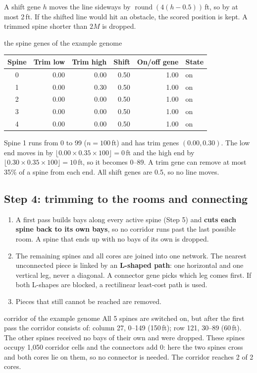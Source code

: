 \documentclass[10pt,a4paper]{article}
\begin{document}
A shift gene $h$ moves the line sideways by $\operatorname{round}(4(h - 0.5))$\,ft, so by at most 2\,ft. If the shifted
line would hit an obstacle, the scored position is kept. A trimmed spine shorter than $2M$ is dropped.

\begin{example}{the spine genes of the example genome}
\begin{center}\centering\small
\begin{tabular}{@{}c r r r r l@{}}
\toprule
\textbf{Spine} & \textbf{Trim low} & \textbf{Trim high} & \textbf{Shift} & \textbf{On/off gene} & \textbf{State} \\ \midrule
0 & 0.00 & 0.00 & 0.50 & 1.00 & on \\
1 & 0.00 & 0.30 & 0.50 & 1.00 & on \\
2 & 0.00 & 0.00 & 0.50 & 1.00 & on \\
3 & 0.00 & 0.00 & 0.50 & 1.00 & on \\
4 & 0.00 & 0.00 & 0.50 & 1.00 & on \\
\bottomrule
\end{tabular}
\end{center}
Spine 1 runs from 0 to 99 ($n = 100$\,ft) and has trim genes
$(0.00, 0.30)$. The low end moves in by $\lfloor 0.00 \times 0.35 \times 100 \rfloor = 0$\,ft and the
high end by $\lfloor 0.30 \times 0.35 \times 100 \rfloor = 10$\,ft, so it becomes 0--89. A trim
gene can remove at most 35\% of a spine from each end. All shift genes are 0.5, so no line moves.
\end{example}

\subsection{Step 4: trimming to the rooms and connecting}
\begin{enumerate}
\item A first pass builds bays along every active spine (Step 5) and \textbf{cuts each spine back to its own bays}, so
no corridor runs past the last possible room. A spine that ends up with no bays of its own is dropped.
\item The remaining spines and all cores are joined into one network. The nearest unconnected piece is linked by an
\textbf{L-shaped path}: one horizontal and one vertical leg, never a diagonal. A connector gene picks which leg comes
first. If both L-shapes are blocked, a rectilinear least-cost path is used.
\item Pieces that still cannot be reached are removed.
\end{enumerate}
\begin{example}{corridor of the example genome}
All 5 spines are switched on, but after the first pass the corridor consists of: column 27, 0--149 (150\,ft); row 121, 30--89 (60\,ft). The other spines
received no bays of their own and were dropped. These spines occupy 1,050 corridor cells and the connectors add
0: here the two spines cross and both cores lie on them, so no connector is needed. The corridor reaches
2 of 2 cores.
\end{example}
\end{document}
